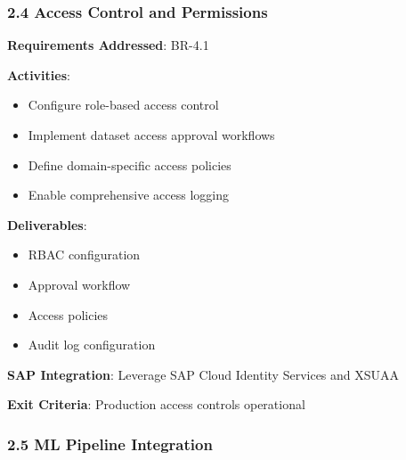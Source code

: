 \subsubsection{2.4 Access Control and Permissions}

\begin{tcolorbox}[colback=green!5,colframe=green!70,title=2.4 RBAC Implementation]
\textbf{Requirements Addressed}: BR-4.1

\textbf{Activities}:
\begin{itemize}
  \item Configure role-based access control
  \item Implement dataset access approval workflows
  \item Define domain-specific access policies
  \item Enable comprehensive access logging
\end{itemize}

\textbf{Deliverables}:
\begin{itemize}
  \item RBAC configuration
  \item Approval workflow
  \item Access policies
  \item Audit log configuration
\end{itemize}

\textbf{SAP Integration}: Leverage SAP Cloud Identity Services and XSUAA

\textbf{Exit Criteria}: Production access controls operational
\end{tcolorbox}

\subsubsection{2.5 ML Pipeline Integration}

